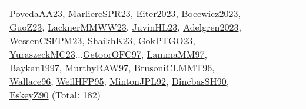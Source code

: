 {\begin{longtable}{p{3cm}r>{\raggedright\arraybackslash}p{6cm}>{\raggedright\arraybackslash}p{6cm}>{\raggedright\arraybackslash}p{8cm}}
\hyperref[detail:PovedaAA23]{PovedaAA23}, \hyperref[detail:MarliereSPR23]{MarliereSPR23}, \hyperref[detail:Eiter2023]{Eiter2023}, \hyperref[detail:Bocewicz2023]{Bocewicz2023}, \hyperref[detail:GuoZ23]{GuoZ23}, \hyperref[detail:LacknerMMWW23]{LacknerMMWW23}, \hyperref[detail:JuvinHL23]{JuvinHL23}, \hyperref[detail:Adelgren2023]{Adelgren2023}, \hyperref[detail:WessenCSFPM23]{WessenCSFPM23}, \hyperref[detail:ShaikhK23]{ShaikhK23}, \hyperref[detail:GokPTGO23]{GokPTGO23}, \hyperref[detail:YuraszeckMC23]{YuraszeckMC23}...\hyperref[detail:GetoorOFC97]{GetoorOFC97}, \hyperref[detail:LammaMM97]{LammaMM97}, \hyperref[detail:Baykan1997]{Baykan1997}, \hyperref[detail:MurthyRAW97]{MurthyRAW97}, \hyperref[detail:BrusoniCLMMT96]{BrusoniCLMMT96}, \hyperref[detail:Wallace96]{Wallace96}, \hyperref[detail:WeilHFP95]{WeilHFP95}, \hyperref[detail:MintonJPL92]{MintonJPL92}, \hyperref[detail:DincbasSH90]{DincbasSH90}, \hyperref[detail:EskeyZ90]{EskeyZ90} (Total: 182)\\

\end{longtable}}

